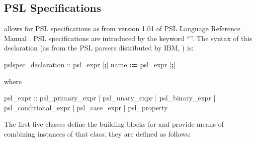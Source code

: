 \subsection{PSL Specifications}
\label{PSL Specifications}
%
\nusmv allows for PSL specifications as from version 1.01 of PSL
Language Reference Manual \cite{PSLLRM}. PSL specifications
are introduced by the keyword ``''. The syntax of this
declaration (as from the PSL parsers distributed by IBM, \cite{PSLparser}) is:
%
\begin{Grammar}
pslspec_declaration ::  psl_expr [\textbf{;}]
                         name \textbf{:=} psl_expr [\textbf{;}]
\end{Grammar}
%
where
%
\begin{Grammar}
psl_expr ::
   psl_primary_expr
 | psl_unary_expr
 | psl_binary_expr
 | psl_conditional_expr
 | psl_case_expr
 | psl_property
\end{Grammar}
%
The first five classes define the building blocks for
 and provide means of combining
instances of that class; they are defined as follows:

